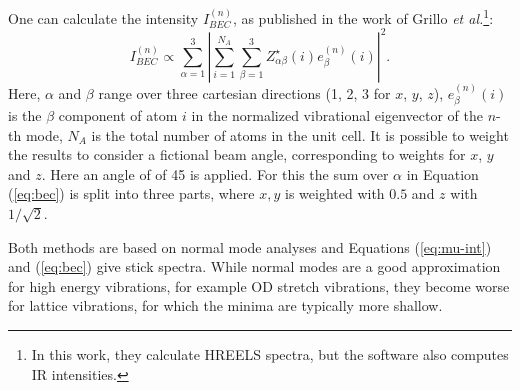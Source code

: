 \documentclass[11pt,DIV=13,BCOR=5mm,a4paper,headinclude]{scrbook}
\begin{document}
\begin{itemize}
One can calculate the intensity $I^{(n)}_{BEC}$\cite{Bruesch1986,Baroni2001}, as published in the work of Grillo \textit{et al.}\cite{BEC}\footnote{In this work, they calculate HREELS spectra, but the software also computes IR intensities.}:
\begin{equation}\label{eq:bec}
  I_{BEC}^{(n)} \propto \sum_{\alpha=1}^3|\sum_{i=1}^{N_A}\sum_{\beta=1}^3 Z_{\alpha\beta}^\star(i)e^{(n)}_\beta(i)|^2.
\end{equation}
Here, $\alpha$ and $\beta$ range over three cartesian directions (1, 2, 3 for $x$, $y$, $z$), $e^{(n)}_\beta(i)$ is the $\beta$ component of atom $i$ in the normalized vibrational eigenvector of the $n$-th mode, $N_A$ is the total number of atoms in the unit cell.
It is possible to weight the results to consider a fictional beam angle, corresponding to weights for $x$, $y$ and $z$.
Here an angle of of 45\textdegree{} is applied.
For this the sum over $\alpha$ in Equation (\ref{eq:bec}) is split into three parts, where $x, y$ is weighted with $0.5$ and $z$ with $1/\sqrt{2}$.


\end{itemize}
Both methods are based on normal mode analyses and Equations (\ref{eq:mu-int}) and (\ref{eq:bec}) give stick spectra.
While normal modes are a good approximation for high energy vibrations, for example OD stretch vibrations, they become worse for lattice vibrations, for which the minima are typically more shallow.
\end{document}
